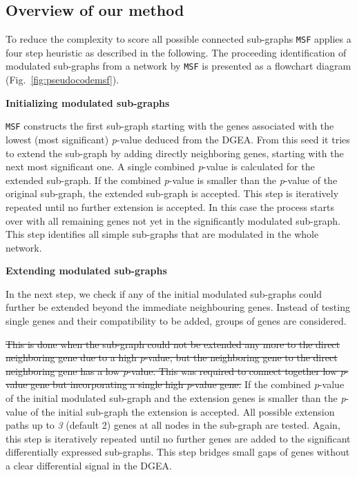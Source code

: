 \documentclass[10pt,a4paper,twocolumn]{article}
\newcommand{\FA}[1]{\begingroup\color{magenta}#1\endgroup}
\begin{document}
	\subsection*{Overview of our method}
	
	To reduce the complexity to score all possible connected sub-graphs
	\texttt{MSF} applies a four step heuristic as described in the
	following. The proceeding identification of modulated sub-graphs from a
	network by \texttt{MSF} is presented as a flowchart diagram
	(Fig.~\ref{fig:pseudocodemsf}). \newline
	
	
	
	\textbf{Initializing modulated sub-graphs}
	
	\texttt{MSF} constructs the first sub-graph starting with the genes
	associated with the lowest (most significant) \textit{p}-value deduced from
	the DGEA. From this seed it tries to extend the sub-graph by adding directly
	neighboring genes, starting with the next most significant one. A single
	combined \textit{p}-value is calculated for the extended sub-graph.
	If the combined \textit{p}-value is smaller than the \textit{p}-value of
	the original sub-graph,
	the extended sub-graph is accepted. This step is
	iteratively repeated until no further extension is accepted. In this case
	the process starts over with all remaining genes not yet in the significantly
	modulated sub-graph. This step identifies all simple sub-graphs that
	are modulated in the whole network.\newline
	
	\textbf{Extending modulated sub-graphs}
	
	In the next step, we check if any of the initial modulated
        sub-graphs could further be extended \FA{beyond the immediate
          neighbouring genes. Instead of testing single genes and
          their compatibility to be added, groups of genes are
          considered.}

        \sout{This is done when the sub-graph could not be extended any more
        to the direct neighboring gene due to a high \textit{p}-value,
        but the neighboring gene to the direct neighboring gene has a
        low \textit{p}-value. This was required to connect together
        low \textit{p}-value gene but incorporating a single high
        \textit{p}-value gene.} If the combined \textit{p}-value of the
        initial modulated sub-graph and the extension genes is smaller
        than the \textit{p}-value of the initial sub-graph the
        extension is accepted. All possible extension paths up to
        \emph{3} (default 2) genes at all nodes in the sub-graph are
        tested. Again, this step is iteratively repeated until no
        further genes are added to the significant differentially
        expressed sub-graphs. This step bridges small gaps of genes
        without a clear differential signal in the DGEA.\newline
	
\end{document}
